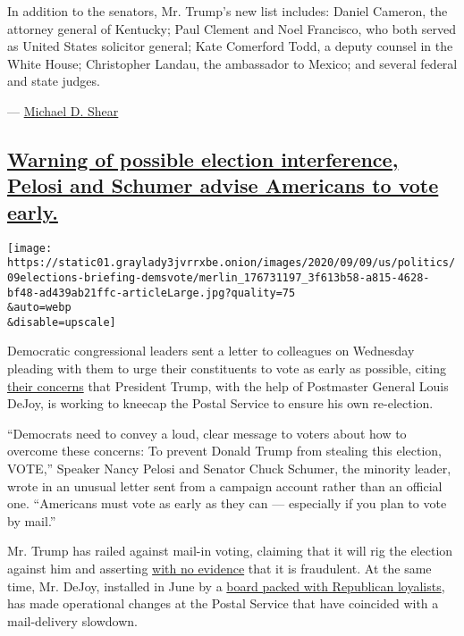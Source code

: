In addition to the senators, Mr. Trump's new list includes: Daniel
Cameron, the attorney general of Kentucky; Paul Clement and Noel
Francisco, who both served as United States solicitor general; Kate
Comerford Todd, a deputy counsel in the White House; Christopher Landau,
the ambassador to Mexico; and several federal and state judges.

--- \href{https://www.nytimes3xbfgragh.onion/by/michael-d-shear}{Michael
D. Shear}

\hypertarget{warning-of-possible-election-interference-pelosi-and-schumer-advise-americans-to-vote-early}{%
\subsection{\texorpdfstring{\protect\hyperlink{warning-of-possible-election-interference-pelosi-and-schumer-advise-americans-to-vote-early}{Warning
of possible election interference, Pelosi and Schumer advise Americans
to vote
early.}}{Warning of possible election interference, Pelosi and Schumer advise Americans to vote early.}}\label{warning-of-possible-election-interference-pelosi-and-schumer-advise-americans-to-vote-early}}

\texttt{[image: https://static01.graylady3jvrrxbe.onion/images/2020/09/09/us/politics/09elections-briefing-demsvote/merlin\_176731197\_3f613b58-a815-4628-bf48-ad439ab21ffc-articleLarge.jpg?quality=75\\\&auto=webp\\\&disable=upscale]}

Democratic congressional leaders sent a letter to colleagues on
Wednesday pleading with them to urge their constituents to vote as early
as possible, citing
\href{https://www.nytimes3xbfgragh.onion/2020/08/31/us/postal-service-dejoy-subpoena.html}{their
concerns} that President Trump, with the help of Postmaster General
Louis DeJoy, is working to kneecap the Postal Service to ensure his own
re-election.

``Democrats need to convey a loud, clear message to voters about how to
overcome these concerns: To prevent Donald Trump from stealing this
election, VOTE,'' Speaker Nancy Pelosi and Senator Chuck Schumer, the
minority leader, wrote in an unusual letter sent from a campaign account
rather than an official one. ``Americans must vote as early as they can
--- especially if you plan to vote by mail.''

Mr. Trump has railed against mail-in voting, claiming that it will rig
the election against him and asserting
\href{https://www.nytimes3xbfgragh.onion/article/mail-in-voting-explained.html}{with
no evidence} that it is fraudulent. At the same time, Mr. DeJoy,
installed in June by a
\href{https://www.nytimes3xbfgragh.onion/2020/09/08/us/politics/democrats-postal-service-board-trump.html}{board
packed with Republican loyalists}, has made operational changes at the
Postal Service that have coincided with a mail-delivery slowdown.

